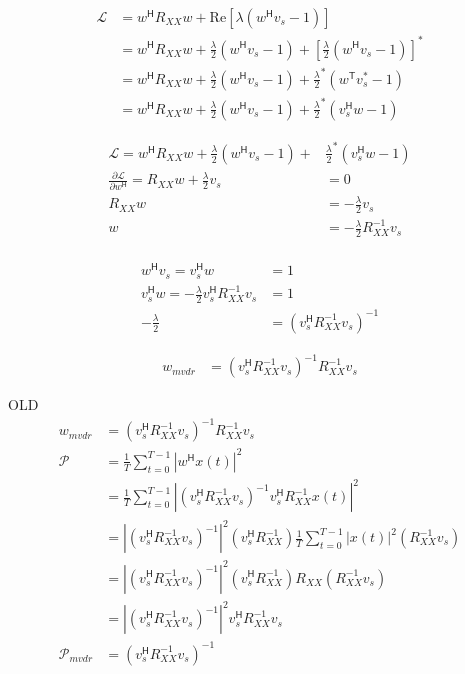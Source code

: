 \documentclass{article}
\begin{document}
\begin{align*}
	\mathcal{L} &= w^\mathsf{H} R_{XX} w + \text{Re} [\lambda (w^\mathsf{H}v_s - 1)]
	\\
	&= w^\mathsf{H} R_{XX} w + \frac{\lambda}{2} (w^\mathsf{H}v_s - 1) + \left[ \frac{\lambda}{2} (w^\mathsf{H}v_s - 1) \right]^*
	\\
	&= w^\mathsf{H} R_{XX} w + \frac{\lambda}{2} (w^\mathsf{H}v_s - 1) + \frac{\lambda}{2}^* (w^\mathsf{T}v_s^* - 1)
	\\
	&= w^\mathsf{H} R_{XX} w + \frac{\lambda}{2} (w^\mathsf{H}v_s - 1) + \frac{\lambda}{2}^* (v_s^\mathsf{H} w - 1)
\end{align*}


\begin{align*}
	\mathcal{L} = w^\mathsf{H} R_{XX} w + \frac{\lambda}{2} (w^\mathsf{H}v_s - 1) + &\frac{\lambda}{2}^* (v_s^\mathsf{H} w - 1)
	\\
	\frac{\partial \mathcal{L}}{\partial w^\mathsf{H}} = R_{XX} w + \frac{\lambda}{2} v_s &= 0
	\\
	R_{XX} w &= - \frac{\lambda}{2} v_s 
	\\
	w &= - \frac{\lambda}{2} R_{XX}^{-1} v_s 
	\\
\end{align*}


\begin{align*}
	w^\mathsf{H}v_s = v_s^\mathsf{H}w &= 1
	\\
	v_s^\mathsf{H}w = - \frac{\lambda}{2} v_s^\mathsf{H} R_{XX}^{-1} v_s &= 1
	\\
	 - \frac{\lambda}{2} &= (v_s^\mathsf{H} R_{XX}^{-1} v_s)^{-1}
\end{align*}

\begin{align*}
	w_{mvdr} &= (v_s^\mathsf{H} R_{XX}^{-1} v_s)^{-1} R_{XX}^{-1} v_s 
\end{align*}

OLD
\begin{align*}
	w_{mvdr} &= (v_s^\mathsf{H} R_{XX}^{-1} v_s)^{-1} R_{XX}^{-1} v_s 
	\\
	\mathcal{P} &= \frac{1}{T} \sum_{t=0}^{T-1} | w^\mathsf{H} x(t) | ^2
	\\
	&= \frac{1}{T} \sum_{t=0}^{T-1} | (v_s^\mathsf{H} R_{XX}^{-1} v_s)^{-1} v_s ^\mathsf{H} R_{XX}^{-1}  x(t) | ^2
	\\
	&= \left| (v_s^\mathsf{H} R_{XX}^{-1} v_s)^{-1} \right| ^ 2 (v_s ^\mathsf{H} R_{XX}^{-1} ) \frac{1}{T} \sum_{t=0}^{T-1}  | x(t) | ^2 (R_{XX}^{-1}v_s)
	\\
	&= \left| (v_s^\mathsf{H} R_{XX}^{-1} v_s)^{-1} \right| ^ 2 ( v_s ^\mathsf{H} R_{XX}^{-1} ) R_{XX} (R_{XX}^{-1}v_s)
	\\
	&= \left| (v_s^\mathsf{H} R_{XX}^{-1} v_s)^{-1} \right| ^ 2  v_s ^\mathsf{H} R_{XX}^{-1}v_s
	\\
	\mathcal{P}_{mvdr} &= (v_s^\mathsf{H} R_{XX}^{-1} v_s)^{-1} 
\end{align*}
\end{document}

